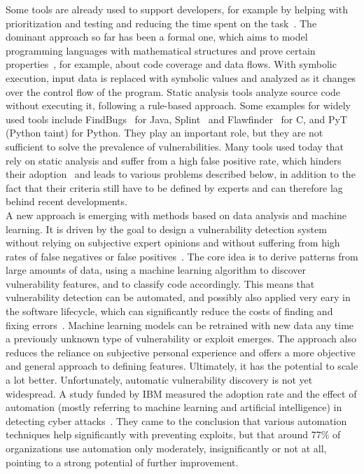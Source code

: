 \documentclass[
a4paper,
pagesize,
pdftex,
12pt,
twoside, %
BCOR=5mm, %
ngerman,
fleqn,
final,
]{scrartcl}
\begin{document}
	Some tools are already used to support developers, for example by helping with prioritization and testing and reducing the time spent on the task~\cite{Dam.2017}. The dominant approach so far has been a formal one, which aims to model programming languages with mathematical structures and prove certain properties~\cite{Allamanis.2018}, for example, about code coverage and data flows. With symbolic execution, input data is replaced with symbolic values and analyzed as it changes over the control flow of the program. Static analysis tools analyze source code without executing it, following a rule-based approach. Some examples for widely used tools include FindBugs~\cite{Hovemeyer.2004,Hovemeyer.2005} for Java, Splint~\cite{Evans.2002} and Flawfinder~\cite{Wheeler.2006} for C, and PyT~\cite{Micheelsen.2016} (Python taint) for Python. They play an important role, but they are not sufficient to solve the prevalence of vulnerabilities. Many tools used today that rely on static analysis and suffer from a high false positive rate, which hinders their adoption~\cite{Liu.2018} and leads to various problems described below, in addition to the fact that their criteria still have to be defined by experts and can therefore lag behind recent developments.\\
	A new approach is emerging with methods based on data analysis and machine learning. It is driven by the goal to design a vulnerability detection system without relying on subjective expert opinions and without suffering from high rates of false negatives or false positives~\cite{Li.2018}. The core idea is to derive patterns from large amounts of data, using a machine learning algorithm to discover vulnerability features, and to classify code accordingly. This means that vulnerability detection can be automated, and possibly also applied very eary in the software lifecycle, which can significantly reduce the costs of finding and fixing errors~\cite{Dam.2017,Gupta.2014}. Machine learning models can be retrained with new data any time a previously unknown type of vulnerability or exploit emerges. The approach also reduces the reliance on subjective personal experience and offers a more objective and general approach to defining features. Ultimately, it has the potential to scale a lot better. Unfortunately, automatic vulnerability discovery is not yet widespread. A study funded by IBM measured the adoption rate and the effect of automation (mostly referring to machine learning and artificial intelligence) in detecting cyber attacks~\cite{IBMNewsRoom.}. They came to the conclusion that various automation techniques help significantly with preventing exploits, but that around 77\% of organizations use automation only moderately, insignificantly or not at all, pointing to a strong potential of further improvement. 
	
\end{document}
